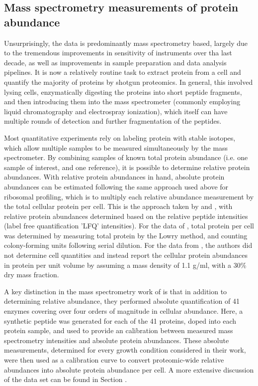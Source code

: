 \subsection{Mass spectrometry measurements of protein abundance}

Unsurprisingly, the data is predominantly mass spectrometry based, largely due
to the tremendous improvements in sensitivity of instruments over tha last
decade, as well as improvements in sample preparation and data analysis
pipelines. It is now a relatively routine task to extract protein from a cell
and quantify the majority of proteins by shotgun proteomics. In general, this
involved lysing cells, enzymatically digesting the proteins into short peptide
fragments, and then introducing them into the mass spectrometer (commonly
employing liquid chromatography and electrospray ionization), which itself can
have multiple rounds of detection and further fragmentation of the peptides.

Most quantitative experiments rely on labeling protein with stable isotopes,
which allow multiple samples to be measured simultaneously by the mass
spectrometer. By combining samples of known total protein abundance (i.e. one
sample of interest, and one reference), it is possible to determine relative
protein abundances. With relative protein abundances in hand, absolute protein
abundances can be estimated following the same approach used above for ribosomal
profiling, which is to multiply each relative abundance measurement by the total
cellular protein per cell. This is the approach taken by \cite{valgepea2013} and
\cite{peebo2015}, with relative protein abundances determined based on the
relative peptide intensities (label free quantification 'LFQ' intensities). For
the data of \cite{valgepea2013}, total protein per cell was determined by
measuring  total protein by the Lowry method, and counting colony-forming units
following serial dilution. For the data from   \cite{peebo2015}, the authors did
not determine  cell quantities and instead report the cellular protein
abundances in protein per unit  volume by assuming a mass density of 1.1 g/ml,
with a 30\% dry mass fraction.

A key distinction in the mass spectrometry work of \cite{schmidt2016} is that in
addition to determining relative abundance, they performed absolute
quantification of  41 enzymes covering over four orders of magnitude in cellular
abundance. Here,  a synthetic peptide was generated for each of the 41 proteins,
doped into each protein sample, and used to provide an calibration between
measured mass spectrometry intensities and absolute protein abundances. These
absolute measurements, determined for every growth condition considered in their
work,   were then used as a calibration curve to convert proteomic-wide relative
abundances into  absolute protein abundance per cell. A more extensive
discussion of the \cite{schmidt2016} data set can be found in Section
 .

